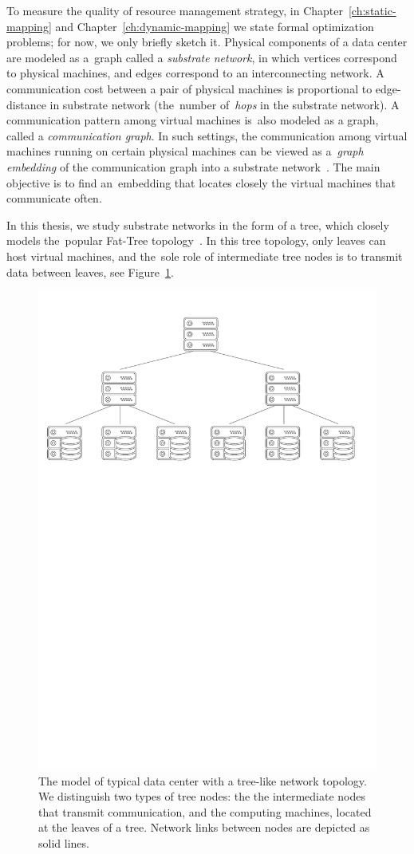 To measure the quality of resource management strategy, in Chapter~\ref{ch:static-mapping} and Chapter~\ref{ch:dynamic-mapping} we state formal optimization problems; for now, we only briefly sketch it.
Physical components of a data center are modeled as a~graph called a \emph{substrate network}, in which vertices correspond to physical machines, and edges correspond to an interconnecting network.
A communication cost between a pair of physical machines is proportional to edge-distance in substrate network (the~number of~\emph{hops} in the substrate network).
A communication pattern among virtual machines is~also modeled as a graph, called a \emph{communication graph}.
In such settings, the communication among virtual machines running on certain physical machines can be viewed as a~\emph{graph embedding} of the communication graph into a substrate network~\cite{gupta2001provisioning}.
The main objective is to find an~embedding that locates closely the virtual machines that communicate often.

In this thesis, we study substrate networks in the form of a tree, which closely models the~popular Fat-Tree topology~\cite{fat-trees}.
In this tree topology, only leaves can host virtual machines, and the~sole role of intermediate tree nodes is to transmit data between leaves, see Figure~\ref{fig:tree-topology}.


\begin{figure}[t]
\centering
\includegraphics[width=0.79\columnwidth]{figs/tree-topology.pdf}
\caption{The model of typical data center with a tree-like network topology. We distinguish two types of tree nodes: the the intermediate nodes that transmit communication, and the computing machines, located at the leaves of a tree. Network links between nodes are depicted as solid lines.}\label{fig:tree-topology}
\vspace{-1em}
\end{figure}


